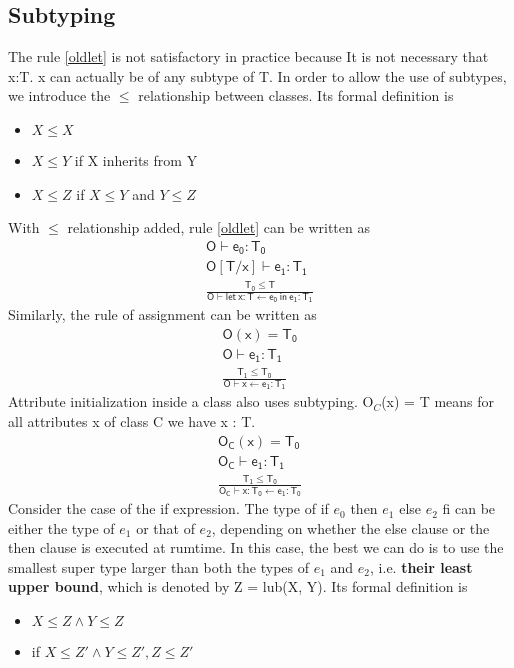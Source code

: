 \subsection{Subtyping} 
The rule \eqref{oldlet} is not satisfactory in practice because It is not necessary that x:T. {\sf x} can actually be of any subtype of T.  In order to allow the use of subtypes, we introduce the $\leq$ relationship between classes. Its formal definition is 
\begin{itemize}
\item $X\leq X$
\item $X\leq Y$ if X inherits from Y
\item $X\leq Z$ if $X\leq Y$ and $Y\leq Z$
\end{itemize}
With $\leq$ relationship added, rule \eqref{oldlet} can be written as 
\begin{gather*}
\mathsf{O\vdash e_0:T_0}\\
\mathsf{O[T/x]\vdash e_1:T_1}\\
\mathsf{\frac{T_0\leq T}{ O\vdash let\:x:T\leftarrow e_0\:in\:e_1:T_1}}
\end{gather*}
Similarly, the rule of assignment can be written as
\begin{gather*}
\mathsf{O(x) = T_0}\\
\mathsf{O\vdash e_1:T_1}\\
\mathsf{\frac{T_1\leq T_0}{ O\vdash x\leftarrow e_1:T_1}}
\end{gather*}
Attribute initialization inside a class also uses subtyping. O$_C$(x) = T means for all attributes x of class C we have x : T.
\begin{gather*}
\mathsf{O_C(x)=T_0}\\
\mathsf{O_C\vdash e_1:T_1}\\
\mathsf{\frac{T_1\leq T_0}{ O_C\vdash x:T_0\leftarrow e_1:T_0}}
\end{gather*}
Consider the case of the \textsf{if} expression. The type of {\sf if $e_0$ then $e_1$ else $e_2$ fi} can be either the type of $e_1$ or that of $e_2$, depending on whether the else clause or the then clause is executed at rumtime. In this case, the best we can do is to use the smallest super type larger than both the types of $e_1$ and $e_2$, i.e. \textbf{their least upper bound}, which is denoted by {\sf Z = lub(X, Y)}. Its formal definition is 
\begin{itemize}
\item $X\leq Z\land Y\leq Z$
\item if $X\leq Z'\land Y\leq Z', Z\leq Z'$
\end{itemize}
